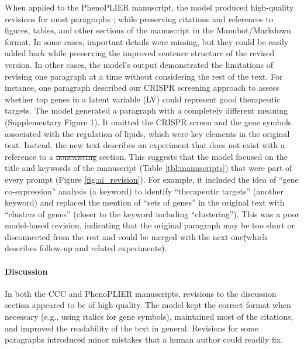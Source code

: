 \documentclass[
]{article}
\providecommand{\DIFaddtex}[1]{{\protect\color{blue}\uwave{#1}}} %
\providecommand{\DIFdeltex}[1]{{\protect\color{red}\sout{#1}}}                      %
\providecommand{\DIFaddbegin}{} %
\providecommand{\DIFaddend}{} %
\providecommand{\DIFdelbegin}{} %
\providecommand{\DIFdelend}{} %
\providecommand{\DIFadd}[1]{\texorpdfstring{\DIFaddtex{#1}}{#1}} %
\providecommand{\DIFdel}[1]{\texorpdfstring{\DIFdeltex{#1}}{}} %
\newcommand{\DIFscaledelfig}{0.5}
\newlength{\DIFdelgraphicswidth} %
\newlength{\DIFdelgraphicsheight} %
\newcommand{\DIFaddincludegraphics}[2][]{{\color{blue}\fbox{\DIFOincludegraphics[#1]{#2}}}} %
\newcommand{\DIFdelincludegraphics}[2][]{%
\sbox{\DIFdelgraphicsbox}{\DIFOincludegraphics[#1]{#2}}%
\settoboxwidth{\DIFdelgraphicswidth}{\DIFdelgraphicsbox} %
\settoboxtotalheight{\DIFdelgraphicsheight}{\DIFdelgraphicsbox} %
\scalebox{\DIFscaledelfig}{%
\parbox[b]{\DIFdelgraphicswidth}{\usebox{\DIFdelgraphicsbox}\\[-\baselineskip] \rule{\DIFdelgraphicswidth}{0em}}\llap{\resizebox{\DIFdelgraphicswidth}{\DIFdelgraphicsheight}{%
\setlength{\unitlength}{\DIFdelgraphicswidth}%
\begin{picture}(1,1)%
\thicklines\linethickness{2pt} %
{\color[rgb]{1,0,0}\put(0,0){\framebox(1,1){}}}%
{\color[rgb]{1,0,0}\put(0,0){\line( 1,1){1}}}%
{\color[rgb]{1,0,0}\put(0,1){\line(1,-1){1}}}%
\end{picture}%
}\hspace*{3pt}}} %
} %
\DeclareRobustCommand{\DIFaddbegin}{\DIFOaddbegin \let\includegraphics\DIFaddincludegraphics} %
\DeclareRobustCommand{\DIFaddend}{\DIFOaddend \let\includegraphics\DIFOincludegraphics} %
\DeclareRobustCommand{\DIFdelbegin}{\DIFOdelbegin \let\includegraphics\DIFdelincludegraphics} %
\DeclareRobustCommand{\DIFdelend}{\DIFOaddend \let\includegraphics\DIFOincludegraphics} %
\begin{document}
When applied to the PhenoPLIER manuscript, the model produced high-quality revisions for most paragraphs \DIFdelbegin \DIFdel{, }\DIFdelend while preserving citations and references to figures, tables, and other sections of the manuscript in the Manubot/Markdown format.
In some cases, important details were missing, but they could be easily added back while preserving the improved sentence structure of the revised version.
In other cases, the model's output demonstrated the limitations of revising one paragraph at a time without considering the rest of the text.
For instance, one paragraph described our CRISPR screening approach to assess whether top genes in a latent variable (LV) could represent good therapeutic targets.
The model generated a paragraph with a completely different meaning (Supplementary Figure 1).
It omitted the CRISPR screen and the gene symbols associated with the regulation of lipids, which were key elements in the original text.
Instead, the new text describes an experiment that does not exist with a reference to a \DIFdelbegin \DIFdel{nonexisting }\DIFdelend \DIFaddbegin \DIFadd{non-existent }\DIFaddend section.
This suggests that the model focused on the title and keywords of the manuscript (Table \ref{tbl:manuscripts}) that were part of every prompt (Figure \ref{fig:ai_revision}).
For example, it included the idea of ``gene co-expression'' analysis (a keyword) to identify ``therapeutic targets'' (another keyword) and replaced the mention of ``sets of genes'' in the original text with ``clusters of genes'' (closer to the keyword including ``clustering'').
This was a poor model-based revision, indicating that the original paragraph may be too short or disconnected from the rest and could be merged with the next one\DIFdelbegin \DIFdel{(}\DIFdelend \DIFaddbegin \DIFadd{, }\DIFaddend which describes follow-up and related experiments\DIFdelbegin \DIFdel{)}\DIFdelend .

\hypertarget{discussion}{%
\paragraph{Discussion}\label{discussion}}

In both the CCC and PhenoPLIER manuscripts, revisions to the discussion section appeared to be of high quality.
The model kept the correct format when necessary (e.g., using italics for gene symbols), maintained most of the citations, and improved the readability of the text in general.
Revisions for some paragraphs introduced minor mistakes that a human author could readily fix.
\end{document}
